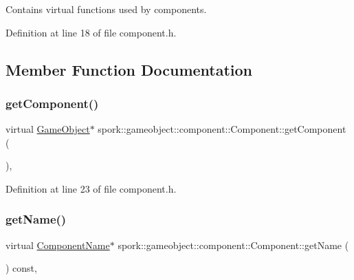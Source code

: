 Contains virtual functions used by components. 

Definition at line 18 of file component.\+h.



\subsection{Member Function Documentation}
\mbox{\label{classspork_1_1gameobject_1_1component_1_1_component_a11b1d17611783ab6e909635bb0dc77c8}} 
\subsubsection{\texorpdfstring{get\+Component()}{getComponent()}}
{\footnotesize\ttfamily virtual \hyperlink{classspork_1_1gameobject_1_1_game_object}{Game\+Object}$\ast$ spork\+::gameobject\+::component\+::\+Component\+::get\+Component (\begin{DoxyParamCaption}{ }\end{DoxyParamCaption})\hspace{0.3cm}{\ttfamily [inline]}, {\ttfamily [virtual]}}



Definition at line 23 of file component.\+h.

\mbox{\label{classspork_1_1gameobject_1_1component_1_1_component_ac47356483f2a091e46ad7aaf99cb1595}} 
\subsubsection{\texorpdfstring{get\+Name()}{getName()}}
{\footnotesize\ttfamily virtual \hyperlink{structspork_1_1gameobject_1_1component_1_1_component_name}{Component\+Name}$\ast$ spork\+::gameobject\+::component\+::\+Component\+::get\+Name (\begin{DoxyParamCaption}{ }\end{DoxyParamCaption}) const\hspace{0.3cm}{\ttfamily [inline]}, {\ttfamily [virtual]}}



